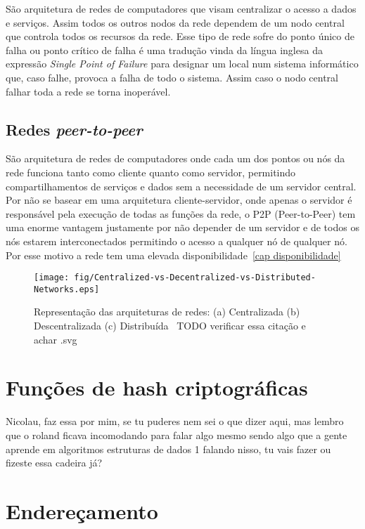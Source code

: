 São arquitetura de redes de computadores que visam centralizar o acesso a dados e serviços.
Assim todos os outros nodos da rede dependem de um nodo central que controla todos os recursos da rede.
Esse tipo de rede sofre do ponto único de falha ou ponto crítico de falha é uma tradução vinda da língua inglesa da expressão \textit{Single Point of Failure} para designar um local num sistema informático que, caso falhe, provoca a falha de todo o sistema.
Assim caso o nodo central falhar toda a rede se torna inoperável.

\subsection{Redes \textit{peer-to-peer}}

São arquitetura de redes de computadores onde cada um dos pontos ou nós da rede funciona tanto como cliente quanto como servidor, permitindo compartilhamentos de serviços e dados sem a necessidade de um servidor central.
Por não se basear em uma arquitetura cliente-servidor, onde apenas o servidor é responsável pela execução de todas as funções da rede, o P2P (Peer-to-Peer) tem uma enorme vantagem justamente por não depender de um servidor e de todos os nós estarem interconectados permitindo o acesso a qualquer nó de qualquer nó. 
Por esse motivo a rede tem uma elevada disponibilidade~\ref{cap disponibilidade}
\begin{figure}[htb!]
\centering\texttt{[image: fig/Centralized-vs-Decentralized-vs-Distributed-Networks.eps]}
\caption[Representação das arquiteturas de redes]
        {\label{fig:tipos-de-redes}Representação das arquiteturas de redes: (a) Centralizada (b) Descentralizada 
        (c) Distribuída~\cite{Imagem1} TODO verificar essa citação e achar .svg}
\end{figure}

\section{Funções de hash criptográficas}

Nicolau, faz essa por mim, se tu puderes nem sei o que dizer aqui, mas lembro que o roland ficava incomodando para falar algo mesmo sendo algo que a gente aprende em algoritmos estruturas de dados 1
falando nisso, tu vais fazer ou fizeste essa cadeira já?

\section{Endereçamento}

